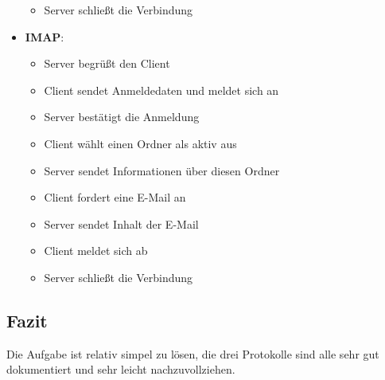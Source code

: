 \begin{itemize}
\begin{itemize}
		\item Server schließt die Verbindung
	\end{itemize}
	\item \textbf{IMAP}: 
	\begin{itemize}
		\item Server begrüßt den Client
		\item Client sendet Anmeldedaten und meldet sich an
		\item Server bestätigt die Anmeldung
		\item Client wählt einen Ordner als aktiv aus
		\item Server sendet Informationen über diesen Ordner
		\item Client fordert eine E-Mail an
		\item Server sendet Inhalt der E-Mail
		\item Client meldet sich ab
		\item Server schließt die Verbindung
	\end{itemize}
\end{itemize}

\subsection{Fazit}
Die Aufgabe ist relativ simpel zu lösen, die drei Protokolle sind alle sehr gut dokumentiert und sehr leicht nachzuvollziehen. 